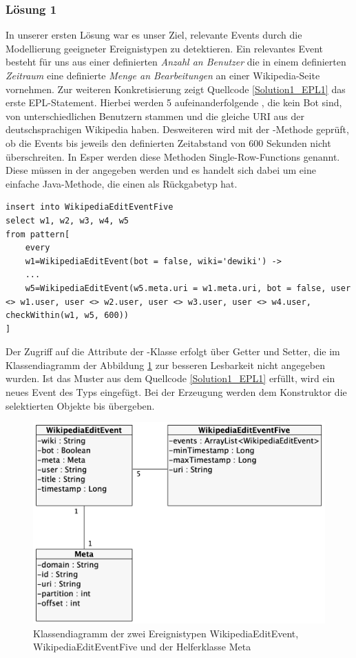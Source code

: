 \subsubsection{Lösung 1}
In unserer ersten Lösung war es unser Ziel, relevante Events durch die Modellierung geeigneter Ereignistypen zu detektieren.
Ein relevantes Event besteht für uns aus einer definierten \textit{Anzahl an Benutzer} die in einem
definierten \textit{Zeitraum} eine definierte \textit{Menge an Bearbeitungen} an einer Wikipedia-Seite vornehmen.
Zur weiteren Konkretisierung zeigt Quellcode \ref{Solution1_EPL1} das erste EPL-Statement. Hierbei werden
5 aufeinanderfolgende , die kein Bot sind, von unterschiedlichen Benutzern stammen
und die gleiche URI aus der deutschsprachigen Wikipedia haben. Desweiteren wird mit der -Methode
geprüft, ob die Events  bis  jeweils den definierten Zeitabstand von 600 Sekunden nicht überschreiten.
In Esper werden diese Methoden Single-Row-Functions genannt. Diese müssen in der  angegeben werden
und es handelt sich dabei um eine einfache Java-Methode, die einen  als Rückgabetyp hat.

\begin{lstlisting}[label=Solution1_EPL1,caption=Lösung 1: EPL-Statement 1,language=epl,firstnumber=1,captionpos=b]
insert into WikipediaEditEventFive
select w1, w2, w3, w4, w5
from pattern[
    every
    w1=WikipediaEditEvent(bot = false, wiki='dewiki') ->
    ...
    w5=WikipediaEditEvent(w5.meta.uri = w1.meta.uri, bot = false, user <> w1.user, user <> w2.user, user <> w3.user, user <> w4.user, checkWithin(w1, w5, 600))
]
\end{lstlisting}

Der Zugriff auf die Attribute der -Klasse erfolgt über Getter und Setter, die im Klassendiagramm
der Abbildung \ref{fig:class_diagram_eventtypes} zur besseren Lesbarkeit nicht angegeben wurden.
Ist das Muster aus dem Quellcode \ref{Solution1_EPL1} erfüllt, wird ein neues Event des Typs 
eingefügt. Bei der Erzeugung werden dem Konstruktor die selektierten Objekte  bis  übergeben.

\begin{figure}[h]
    \includegraphics[width=.5\textwidth]{images/Esper1.png}
    \caption{Klassendiagramm der zwei Ereignistypen WikipediaEditEvent, WikipediaEditEventFive und der Helferklasse Meta}
    \label{fig:class_diagram_eventtypes}
\end{figure}

